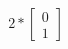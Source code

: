 \documentclass[preview]{standalone}
\begin{document}
\begin{align*}
2* \begin{bmatrix} 0 \\ 1 \end{bmatrix}
\end{align*}
\end{document}
